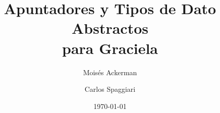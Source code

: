 \documentclass{beamer}
\title[Graciela]{Apuntadores y Tipos de Dato Abstractos \\ para Graciela}
\author[Ackerman - Spaggiari]{Moisés Ackerman \and Carlos Spaggiari}
\institute[USB]{Universidad Simón Bolívar}
\date{\today{}}
\begin{document}
\begin{frame}
  \titlepage
\end{frame}





\end{document}
